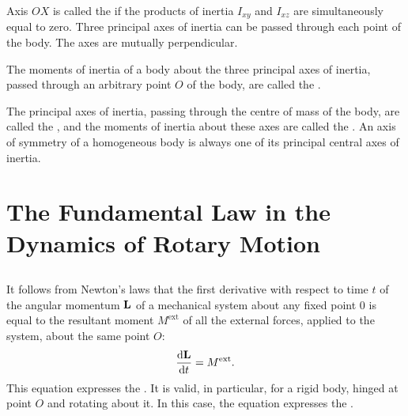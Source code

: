 Axis $OX$ is called the  if the products of inertia $I_{xy}$ and $I_{xz}$ are simultaneously equal to zero. Three principal axes of inertia can be passed through each point of the body. The axes are mutually perpendicular.

The moments of inertia of a body about the three principal axes of inertia, passed through an arbitrary point $O$ of the body, are called the .

The principal axes of inertia, passing through the centre of mass of the body, are called the , and the moments of inertia about these axes are called the . An axis of symmetry of a homogeneous body is always one of its principal central axes of inertia.

\section{The Fundamental Law in the Dynamics of Rotary Motion}
\label{sec-4.3}

\subsection{}\label{4.3.1} It follows from Newton's laws that the first derivative with respect to time $t$ of the angular momentum $\vb{L}$ of a mechan­ical system about any fixed point 0 is equal to the resultant moment $M^{\textrm{ext}}$ of all the external forces, applied to the system, about the same point $O$:
\begin{equation*}%
\dv{\vb{L}}{t} = M^{\textrm{ext}}.
\end{equation*}
This equation expresses the . It is valid, in particular, for a rigid body, hinged at point $O$ and rotating about it. In this case, the equation expresses the .

